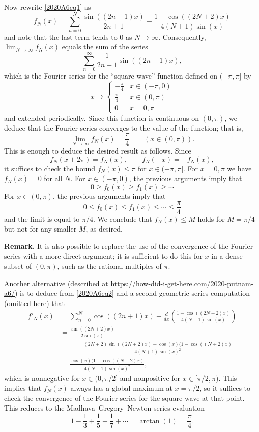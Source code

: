 \documentclass[amssymb,twocolumn,pra,10pt,aps]{revtex4-1}
\begin{document}
\begin{itemize}
Now rewrite \eqref{2020A6eq1} as 
\begin{equation} \label{2020A6eq2}
f_N(x) = \sum_{n=0}^N \frac{ \sin((2n+1)x) }{2n+1}- \frac{1-\cos((2N+2)x)}{4(N+1) \sin(x)}
\end{equation}
and note that the last term tends to 0 as $N \to \infty$.
Consequently, $\lim_{N \to \infty} f_N(x)$ equals the sum of the series
\[
\sum_{n=0}^\infty \frac{1}{2n+1} \sin((2n+1)x),
\]
which is the Fourier series for the ``square wave'' function defined on $(-\pi, \pi]$ by
\[
x \mapsto \begin{cases} -\frac{\pi}{4} & x \in (-\pi, 0) \\
\frac{\pi}{4} & x \in (0, \pi) \\
0 & x = 0, \pi
\end{cases}
\]
and extended periodically. Since this function is continuous on $(0, \pi)$, we deduce that the Fourier series converges to the value of the function; that is,
\[
\lim_{N \to \infty} f_N(x) = \frac{\pi}{4} \qquad (x \in (0, \pi)).
\]
This is enough to deduce the desired result as follows. 
Since
\[
f_N(x+2\pi) = f_N(x), \qquad f_N(-x) = -f_N(x),
\]
it suffices to check the bound $f_N(x) \leq \pi$ for $x \in (-\pi, \pi]$.
For $x = 0, \pi$ we have $f_N(x) = 0$ for all $N$.
For $x \in (-\pi, 0)$, the previous arguments imply that
\[
0 \geq f_0(x) \geq f_1(x) \geq \cdots
\]
For $x \in (0, \pi)$, the previous arguments imply that
\[
0 \leq f_0(x) \leq f_1(x) \leq \cdots \leq \frac{\pi}{4}
\]
and the limit is equal to $\pi/4$. We conclude that $f_N(x) \leq M$ holds for $M = \pi/4$ but not for any smaller $M$, as desired.

\noindent
\textbf{Remark.}
It is also possible to replace the use of the convergence of the Fourier series with a more direct argument; it is sufficient to do this for $x$ in a dense subset of $(0, \pi)$, such as the rational multiples of $\pi$.

Another alternative (described at \url{https://how-did-i-get-here.com/2020-putnam-a6/})
is to deduce from \eqref{2020A6eq2} and a second geometric series computation (omitted here) that
\begin{align*}
f'_N(x) &= \sum_{n=0}^N \cos((2n+1)x) - \frac{d}{dx} \left( \frac{1-\cos((2N+2)x)}{4(N+1) \sin(x)} \right) \\
&=\frac{\sin((2N+2)x)}{2\sin(x)} \\
&\qquad - \frac{(2N+2)\sin((2N+2)x) - \cos(x) (1-\cos((N+2)x)}{4(N+1)\sin(x)^2} \\
&= \frac{\cos(x) (1-\cos((N+2)x)}{4(N+1)\sin(x)^2},
\end{align*}
which is nonnegative for $x \in (0, \pi/2]$ and nonpositive for $x \in [\pi/2, \pi)$.
This implies that $f_N(x)$ always has a global maximum at $x = \pi/2$, so it suffices to check the
convergence of the Fourier series for the square wave at that point. This reduces to the Madhava--Gregory--Newton series evaluation
\[
1 - \frac{1}{3} + \frac{1}{5} - \frac{1}{7} + \cdots = \arctan(1) = \frac{\pi}{4}.
\]



\end{itemize}
\end{document}
